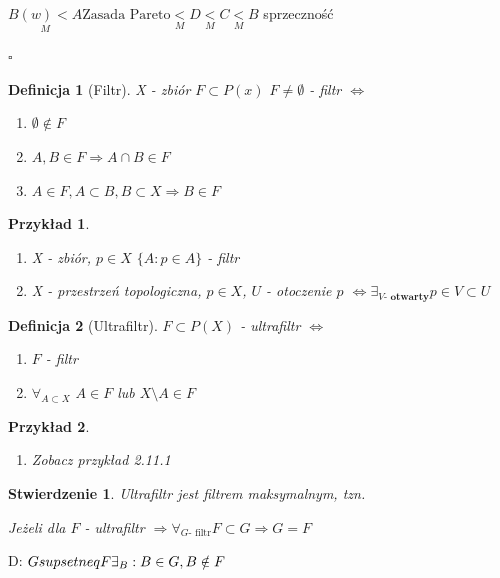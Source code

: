 \documentclass[12pt,a4paper]{article}
\newcounter{twierdzenie}
\theoremstyle{break}
\newtheorem{definition}{Definicja}[section]
\newtheorem{example}{Przykład}[section]
\newtheorem{stwierdzenie}{Stwierdzenie}[section]
\newcommand{\witw}{$\Leftrightarrow$}
\begin{document}
	$B\underset{M}{(w)<}A\text{Zasada Pareto}\underset{M}{ <}D\underset{M}{<}C\underset{M}{<}B$ sprzeczność
			
	\begin{flushright}$\square$\end{flushright}
			
	\begin{definition}[Filtr]
		X - zbiór
		$F\subset P(x)$ $F\neq \emptyset$ - filtr \witw
		\begin{enumerate}[1)]
			\item $\emptyset \notin F$
			\item $A,B \in F \Rightarrow A \cap B \in F$
			\item $A\in F, A\subset B, B\subset X \Rightarrow B\in F$
		\end{enumerate}
	\end{definition}
	
	\begin{example}
		\begin{enumerate}[1.]
			\item X - zbiór, $p \in X$
			$\{A: p\in A \}$ - filtr
			\item X - przestrzeń topologiczna, $p\in X$, $U$ - otoczenie $p$ \witw $\exists_{V\textbf{- otwarty}} p\in V\subset U$
		\end{enumerate}
	\end{example}
	\begin{definition}[Ultrafiltr]
		$F\subset P(X)$ - ultrafiltr \witw
		\begin{enumerate}[1)]
			\item $F$ - filtr
			\item $\forall_{A\subset X}$ $A\in F$ lub $X\setminus A \in F$
		\end{enumerate}
	\end{definition}
	\begin{example}
		\begin{enumerate}[1]
			\item Zobacz przykład 2.11.1
		\end{enumerate}
	\end{example}
	
	\begin{stwierdzenie}
		Ultrafiltr jest filtrem maksymalnym, tzn.
		
		Jeżeli dla $F$ - ultrafiltr $\Rightarrow \forall_{G \text{- filtr}} F\subset G \Rightarrow G=F$
	\end{stwierdzenie}
	D: $G\\supsetneq F \exists_B : B\in G, B\notin F$
	
\end{document}
